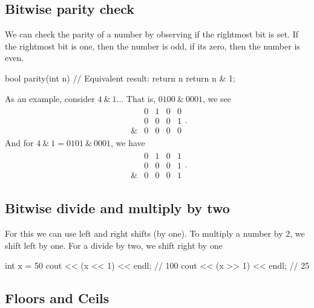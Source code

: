 \documentclass{report}
\begin{document}
    \subsection{Bitwise parity check}
    \bigbreak \noindent 
    We can check the parity of a number by observing if the rightmost bit is set. If the rightmost bit is one, then the number is odd, if its zero, then the number is even.
    \bigbreak \noindent 
    \begin{cppcode}
        bool parity(int n) {
            // Equivalent result: return n %
            return n & 1;
        }
    \end{cppcode}
    \bigbreak \noindent 
    As an example, consider $4\ \&\ 1$... That is, $0100\ \&\ 0001$, we see
    \begin{align*}
        \begin{array}{ccccc}
           &0&1&0&0 \\
           &0&0&0&1 \\
           \hline
            \& & 0 &0&0&0
        \end{array}
    .\end{align*}
    And for $4\ \& \ 1 = 0101\ \& \ 0001$, we have
    \begin{align*}
        \begin{array}{ccccc}
           & 0&1&0&1 \\
           &0&0&0&1 \\
           \hline 
            \& & 0 & 0 & 0& 1
        \end{array}
    .\end{align*}

    \bigbreak \noindent 
    \subsection{Bitwise divide and multiply by two}
    \bigbreak \noindent 
    For this we can use left and right shifts (by one). To multiply a number by 2, we shift left by one. For a divide by two, we shift right by one
    \bigbreak \noindent 
    \begin{cppcode}
    int x = 50
    cout << (x << 1) << endl; // 100
    cout << (x >> 1) << endl; // 25
    \end{cppcode}

    \pagebreak 
    \bigbreak \noindent 
    \subsection{Floors and Ceils}
    \bigbreak \noindent 
\end{document}
